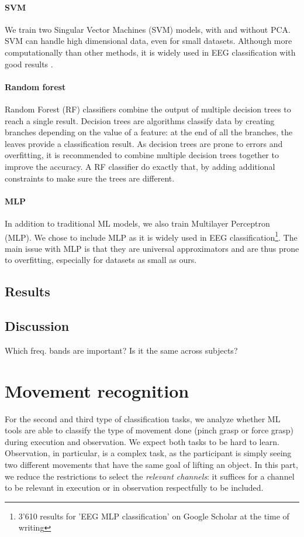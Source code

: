 \documentclass[10pt,conference,compsocconf]{IEEEtran}
\begin{document}
\paragraph{SVM}
We train two Singular Vector Machines (SVM) models, with and without PCA. SVM can handle high dimensional data, even for small datasets. Although more computationally than other methods, it is widely used in EEG classification with good results \cite{knn_svm_review}.

\paragraph{Random forest}
Random Forest (RF) classifiers combine the output of multiple decision trees to reach a single result. Decision trees are algorithms classify data by creating branches depending on the value of a feature: at the end of all the branches, the leaves provide a classification result. As decision trees are prone to errors and overfitting, it is recommended to combine multiple decision trees together to improve the accuracy. A RF classifier do exactly that, by adding additional constraints to make sure the trees are different.

\paragraph{MLP}
In addition to traditional ML models, we also train Multilayer Perceptron (MLP). We chose to include MLP as it is widely used in EEG classification\footnote{3'610 results for 'EEG MLP classification' on Google Scholar at the time of writing}. The main issue with MLP is that they are universal approximators and are thus prone to overfitting, especially for datasets as small as ours.

\subsection{Results}
\subsection{Discussion}
Which freq. bands are important? Is it the same across subjects?

\section{Movement recognition}
\label{sec:objectrecognition}
For the second and third type of classification tasks, we analyze whether ML tools are able to classify the type of movement done (pinch grasp or force grasp) during execution and observation. We expect both tasks to be hard to learn. Observation, in particular, is a complex task, as the participant is simply seeing two different movements that have the same goal of lifting an object. In this part, we reduce the restrictions to select the \textit{relevant channels}: it suffices for a channel to be relevant in execution or in observation respectfully to be included.
\end{document}

